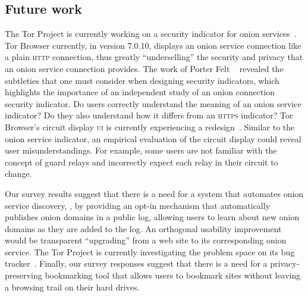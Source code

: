 \subsection{Future work}
\label{sec:future-work}

The Tor Project is currently working on a security indicator for onion
services~\cite{trac23247}.  Tor Browser currently, in version 7.0.10, displays
an onion service connection like a plain \textsc{http} connection, thus greatly
``underselling'' the security and privacy that an onion service connection
provides.  The work of Porter Felt \ea~\cite{Felt2016a} revealed the subtleties
that one must consider when designing security indicators, which highlights the
importance of an independent study of an onion connection security indicator.
Do users correctly understand the meaning of an onion service indicator?  Do
they also understand how it differs from an \textsc{https} indicator?  Tor
Browser's circuit display \textsc{ui} is currently
experiencing a redesign~\cite{trac24309}.  Similar to the onion service
indicator, an empirical evaluation of the circuit display could reveal user
misunderstandings.  For example, some users are not familiar with the concept of
guard relays and incorrectly expect each relay in their circuit to change.

Our survey results suggest that there is a need for a system that automates
onion service discovery, \eg, by providing an opt-in mechanism that
automatically publishes onion domains in a public log, allowing users to learn
about new onion domains as they are added to the log.  An orthogonal usability
improvement would be transparent ``upgrading'' from a web site to its
corresponding onion service.  The Tor Project is currently investigating the
problem space on its bug tracker~\cite{trac21952}.  Finally, our survey
responses suggest that there is a need for a privacy-preserving bookmarking tool
that allows users to bookmark sites without leaving a browsing trail on their
hard drives.
